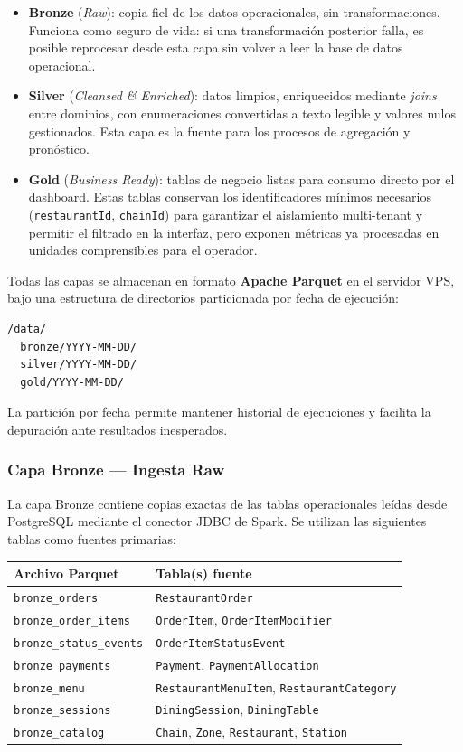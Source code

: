 \documentclass[12pt, letterpaper]{article}
\begin{document}
\begin{itemize}
  \item \textbf{Bronze} (\textit{Raw}): copia fiel de los datos operacionales, sin transformaciones. Funciona como seguro de vida: si una transformación posterior falla, es posible reprocesar desde esta capa sin volver a leer la base de datos operacional.
  \item \textbf{Silver} (\textit{Cleansed \& Enriched}): datos limpios, enriquecidos mediante \textit{joins} entre dominios, con enumeraciones convertidas a texto legible y valores nulos gestionados. Esta capa es la fuente para los procesos de agregación y pronóstico.
  \item \textbf{Gold} (\textit{Business Ready}): tablas de negocio listas para consumo directo por el dashboard. Estas tablas conservan los identificadores mínimos necesarios (\texttt{restaurantId}, \texttt{chainId}) para garantizar el aislamiento multi-tenant y permitir el filtrado en la interfaz, pero exponen métricas ya procesadas en unidades comprensibles para el operador.
\end{itemize}

Todas las capas se almacenan en formato \textbf{Apache Parquet} en el servidor VPS, bajo una estructura de directorios particionada por fecha de ejecución:

\begin{verbatim}
/data/
  bronze/YYYY-MM-DD/
  silver/YYYY-MM-DD/
  gold/YYYY-MM-DD/
\end{verbatim}

La partición por fecha permite mantener historial de ejecuciones y facilita la depuración ante resultados inesperados.

\subsubsection{Capa Bronze — Ingesta Raw}

La capa Bronze contiene copias exactas de las tablas operacionales leídas desde PostgreSQL mediante el conector JDBC de Spark. Se utilizan las siguientes tablas como fuentes primarias:

\begin{longtable}{|p{5cm}|p{8.5cm}|}
\hline
\textbf{Archivo Parquet} & \textbf{Tabla(s) fuente} \\
\hline
\texttt{bronze\_orders} & \texttt{RestaurantOrder} \\
\hline
\texttt{bronze\_order\_items} & \texttt{OrderItem}, \texttt{OrderItemModifier} \\
\hline
\texttt{bronze\_status\_events} & \texttt{OrderItemStatusEvent} \\
\hline
\texttt{bronze\_payments} & \texttt{Payment}, \texttt{PaymentAllocation} \\
\hline
\texttt{bronze\_menu} & \texttt{RestaurantMenuItem}, \texttt{RestaurantCategory} \\
\hline
\texttt{bronze\_sessions} & \texttt{DiningSession}, \texttt{DiningTable} \\
\hline
\texttt{bronze\_catalog} & \texttt{Chain}, \texttt{Zone}, \texttt{Restaurant}, \texttt{Station} \\
\hline
\end{longtable}
\end{document}
